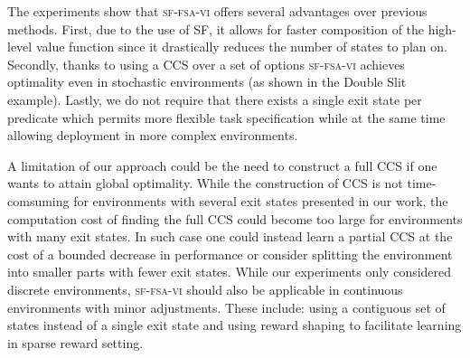 The experiments show that \textsc{sf-fsa-vi} offers several advantages over previous methods. First, due to the use of SF, it allows for faster composition of the high-level value function since it drastically reduces the number of states to plan on. Secondly, thanks to using a CCS over a set of options \textsc{sf-fsa-vi} achieves optimality even in stochastic environments (as shown in the Double Slit example). Lastly, we do not require that there exists a single exit state per predicate which permits more flexible task specification while at the same time allowing deployment in more complex environments. 

A limitation of our approach could be the need to construct a full CCS if one wants to attain global optimality. While the construction of CCS is not time-comsuming for environments with several exit states presented in our work, the computation cost of finding the full CCS could become too large for environments with many exit states. In such case one could instead learn a partial CCS at the cost of a bounded decrease in performance \citep{Alegre2022} or consider splitting the environment into smaller parts with fewer exit states. While our experiments only considered discrete environments, \textsc{sf-fsa-vi} should also be applicable in continuous environments with minor adjustments. These include: using a contiguous set of states instead of a single exit state and using reward shaping to facilitate learning in sparse reward setting.
